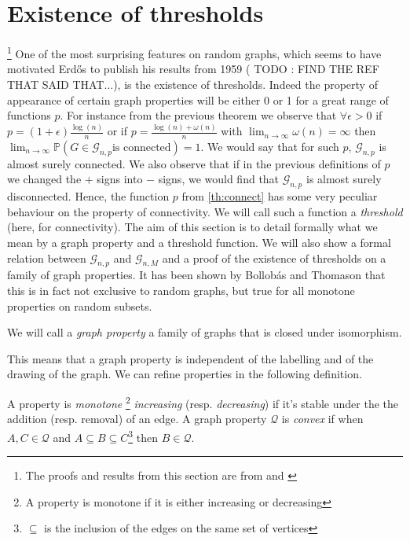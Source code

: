 \section{Existence of thresholds}\footnote{ The proofs and results from this section are from \cite{JLR} and \cite{Bollob01}}
One of the most surprising features on random graphs, which seems to have motivated Erd\H{o}s to publish his results from 1959 ( TODO : FIND THE REF THAT SAID THAT...), is the existence of thresholds.
Indeed the property of appearance of certain graph properties will be either 0 or 1 for a great range of functions $p$.
\newline
For instance from the previous theorem we observe that $\forall \epsilon > 0$  if $p = (1+\epsilon)\frac{\log(n)}{n}$ 
or if $p = \frac{\log(n) + \omega(n)}{n}$ with $\lim_{n\to \infty} \omega(n) = \infty$ then $\lim_{n\to\infty}\mathbb{P}(G \in \mathcal{G}_{n,p} \text{is connected}) = 1$.
We would say that for such $p$, $\mathcal{G}_{n,p}$ is almost surely connected.
We also observe that if in the previous definitions of $p$ we changed the $+$ signs into $-$ signs, we would find that $\mathcal{G}_{n,p}$ is almost surely disconnected.
\newline
Hence, the function $p$ from \ref{th:connect} has some very peculiar behaviour on the property of connectivity.
We will call such a function a \emph{threshold} (here, for connectivity).
\newline
The aim of this section is to detail formally what we mean by a graph property and a threshold function.
We will also show a formal relation between $\mathcal{G}_{n,p}$ and $\mathcal{G}_{n,M}$ and a proof of the existence of thresholds on a family of graph properties.
\newline
It has been shown by Bollob\'as and Thomason \cite{Bollob87} that this is in fact not exclusive to random graphs, but true for all monotone properties on random subsets.
\begin{definition}
	We will call a \emph{graph property} a family of graphs that is closed under isomorphism.
\end{definition}
This means that a graph property is independent of the labelling and of the drawing of the graph.
We can refine properties in the following definition.
\begin{definition}
	A property is \emph{monotone }\footnote{ A property is monotone if it is either increasing or decreasing} \emph{increasing} (resp. \emph{decreasing}) if it's stable under the the addition (resp. removal) of an edge.
	A graph property $\mathcal{Q}$ is \emph{convex} if when $ A,C \in \mathcal{Q}$ and $A\subseteq B\subseteq C$\footnote{ $\subseteq$ is the inclusion of the edges on the same set of vertices} then $B \in \mathcal{Q}$. 
\end{definition}

